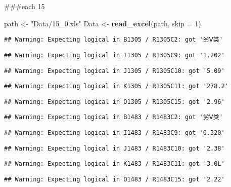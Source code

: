 \documentclass[
]{article}
\newenvironment{Shaded}{\begin{snugshade}}{\end{snugshade}}
\newcommand{\AttributeTok}[1]{\textcolor[rgb]{0.13,0.29,0.53}{#1}}
\newcommand{\DecValTok}[1]{\textcolor[rgb]{0.00,0.00,0.81}{#1}}
\newcommand{\FunctionTok}[1]{\textcolor[rgb]{0.13,0.29,0.53}{\textbf{#1}}}
\newcommand{\NormalTok}[1]{#1}
\newcommand{\OtherTok}[1]{\textcolor[rgb]{0.56,0.35,0.01}{#1}}
\newcommand{\StringTok}[1]{\textcolor[rgb]{0.31,0.60,0.02}{#1}}
\begin{document}
\#\#\#each 15

\begin{Shaded}
\begin{Highlighting}[]
\NormalTok{path }\OtherTok{\textless{}{-}} \StringTok{"Data/15\_0.xls"}
\NormalTok{Data }\OtherTok{\textless{}{-}} \FunctionTok{read\_excel}\NormalTok{(path, }\AttributeTok{skip =} \DecValTok{1}\NormalTok{)}
\end{Highlighting}
\end{Shaded}

\begin{verbatim}
## Warning: Expecting logical in B1305 / R1305C2: got '劣Ⅴ类'
\end{verbatim}

\begin{verbatim}
## Warning: Expecting logical in I1305 / R1305C9: got '1.202'
\end{verbatim}

\begin{verbatim}
## Warning: Expecting logical in J1305 / R1305C10: got '5.09'
\end{verbatim}

\begin{verbatim}
## Warning: Expecting logical in K1305 / R1305C11: got '278.2'
\end{verbatim}

\begin{verbatim}
## Warning: Expecting logical in O1305 / R1305C15: got '2.96'
\end{verbatim}

\begin{verbatim}
## Warning: Expecting logical in B1483 / R1483C2: got '劣Ⅴ类'
\end{verbatim}

\begin{verbatim}
## Warning: Expecting logical in I1483 / R1483C9: got '0.320'
\end{verbatim}

\begin{verbatim}
## Warning: Expecting logical in J1483 / R1483C10: got '2.38'
\end{verbatim}

\begin{verbatim}
## Warning: Expecting logical in K1483 / R1483C11: got '3.0L'
\end{verbatim}

\begin{verbatim}
## Warning: Expecting logical in O1483 / R1483C15: got '2.22'
\end{verbatim}
\end{document}
